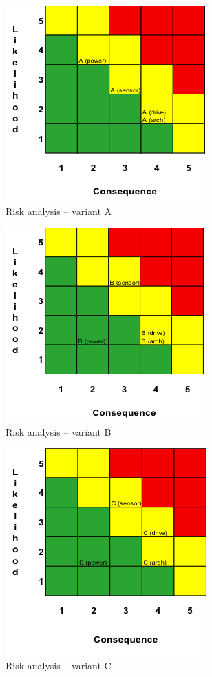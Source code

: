 \documentclass[letterpaper,10pt]{article}
\begin{document}
\begin{figure}[h!tbp]
	\begin{center}
		\includegraphics[scale=1]{images/riskAnalysisA.png}
	\end{center}
	\caption{Risk analysis -- variant A}
	\label{fig:riskAnalysisA}
\end{figure}

\begin{figure}[h!tbp]
	\begin{center}
		\includegraphics[scale=1]{images/riskAnalysisB.png}
	\end{center}
	\caption{Risk analysis -- variant B}
	\label{fig:riskAnalysisB}
\end{figure}

\begin{figure}[h!tbp]
	\begin{center}
		\includegraphics[scale=1]{images/riskAnalysisC.png}
	\end{center}
	\caption{Risk analysis -- variant C}
	\label{fig:riskAnalysisC}
\end{figure}
\end{document}
